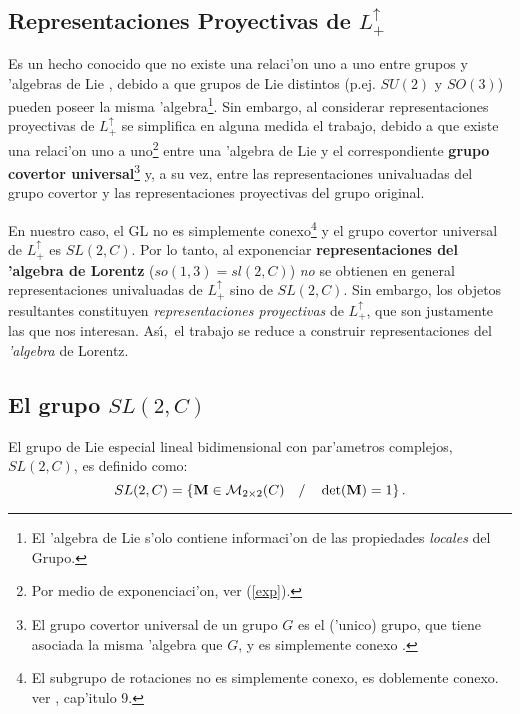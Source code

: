 \subsection{Representaciones Proyectivas de $L_{+}^{\uparrow }$}

Es un hecho conocido que no existe una relaci'on uno a uno entre grupos y
'algebras de Lie \cite{Gilmore}, debido a que grupos de Lie distintos
(p.ej. $SU(2)$ y $SO(3)$) pueden poseer la misma 'algebra\footnote{%
El 'algebra de Lie s'olo contiene informaci'on de las propiedades 
{\em locales} del Grupo.}. Sin embargo, al considerar representaciones
proyectivas de $L_{+}^{\uparrow }$ se simplifica en alguna medida el
trabajo, debido a que existe una relaci'on uno a uno\footnote{%
Por medio de exponenciaci'on, ver (\ref{exp}).} entre una 'algebra de
Lie y el correspondiente {\bf grupo covertor universal}\footnote{%
El grupo covertor universal de un grupo $G$ es el ('unico) grupo, que
tiene asociada la misma 'algebra que $G$, y es simplemente conexo \cite
{Gilmore}.} y, a su vez, entre las representaciones univaluadas del grupo
covertor y las representaciones proyectivas del grupo original.

En nuestro caso, el GL no es simplemente conexo\footnote{%
El subgrupo de rotaciones no es simplemente conexo, es doblemente conexo.
ver \cite{Ham}, cap'itulo 9.} y el grupo covertor universal de $%
L_{+}^{\uparrow }$ es $SL(2,C)$. Por lo tanto, al exponenciar {\bf %
representaciones del 'algebra de Lorentz} ($so(1,3)=sl(2,C)$) {\em no }se
obtienen en general representaciones univaluadas de $L_{+}^{\uparrow }$ sino
de $SL(2,C)$. Sin embargo, los objetos resultantes constituyen {\em %
representaciones proyectivas} de $L_{+}^{\uparrow }$, que son justamente las
que nos interesan. As\'{\i },\ el trabajo se reduce a construir
representaciones del {\em 'algebra} de Lorentz.

\subsection{El grupo $SL(2,C)$}

El grupo de Lie especial lineal bidimensional con par'ametros complejos, $%
SL(2,C)$, es definido como: 
\begin{equation}
SL(2,C)=\left\{ {\bf M}\in {\cal M}_{2\times 2}(C)\quad /\quad \det ({\bf M}%
)=1\right\} . 
\end{equation}

